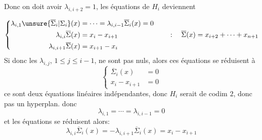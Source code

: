 Donc on doit avoir $\lambda_{i,i+2}=1$, les équations de $H_i$ deviennent

\[
\left\{\begin{aligned}
\lambda_{i,1}\unsure{\overline{\Sigma}_i|\Sigma_i}(x)&=\cdots=\lambda_{i,i-1}\overline{\Sigma}_i(x)=0\\
\lambda_{i,i}\overline{\Sigma}(x)&=x_i-x_{i+1}\\
\lambda_{i,i+1}\overline{\Sigma}(x)&=x_{i+1}-x_i
\end{aligned}\right.
\qquad :\quad\overline{\Sigma}(x)=x_{i+2}+\cdots+x_{n+1}
\]
Si donc les $\lambda_{i,j}$, $1\leq j\leq i-1$, ne sont pas nuls, alors ces équations se réduisent à
\[
\left\{\begin{aligned}
\overline{\Sigma}_i(x)&=0\\
x_i-x_{i+1}&=0
\end{aligned}\right.
\]
ce sont deux équations linéaires indépendantes, donc $H_i$ serait de codim $2$, donc pas un hyperplan.  donc
\[
\lambda_{i,1}=\cdots=\lambda_{i,i-1}=0
\]
et les équations se  réduisent alors:
\[
\lambda_{i,i}\overline{\Sigma}_i(x)=-\lambda_{i,i+1}\overline{\Sigma}_i(x)=x_i-x_{i+1}
\]
 

